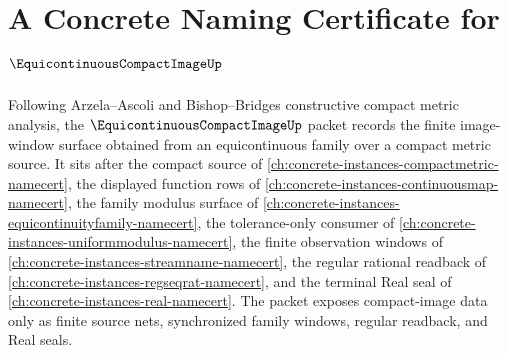 \chapter{A Concrete Naming Certificate for $\EquicontinuousCompactImageUp$}
\label{ch:concrete-instances-equicontinuous-compact-image-namecert}

Following Arzela--Ascoli and Bishop--Bridges constructive compact metric analysis, the $\EquicontinuousCompactImageUp$ packet records the finite image-window surface obtained from an equicontinuous family over a compact metric source. It sits after the compact source of \autoref{ch:concrete-instances-compactmetric-namecert}, the displayed function rows of \autoref{ch:concrete-instances-continuousmap-namecert}, the family modulus surface of \autoref{ch:concrete-instances-equicontinuityfamily-namecert}, the tolerance-only consumer of \autoref{ch:concrete-instances-uniformmodulus-namecert}, the finite observation windows of \autoref{ch:concrete-instances-streamname-namecert}, the regular rational readback of \autoref{ch:concrete-instances-regseqrat-namecert}, and the terminal Real seal of \autoref{ch:concrete-instances-real-namecert}. The packet exposes compact-image data only as finite source nets, synchronized family windows, regular readback, and Real seals.

